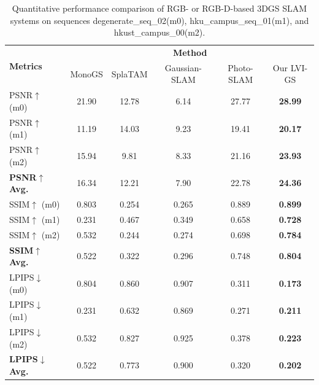 \documentclass[lettersize,journal]{IEEEtran}
\begin{document}
\clearpage %
\begin{table}[!p] %
    \centering
    \vfill %
    \renewcommand{\arraystretch}{1.0} %
    \setlength{\tabcolsep}{10pt} %
    \caption{Quantitative performance comparison of RGB- or RGB-D-based 3DGS SLAM systems on sequences degenerate_seq_02(m0), hku_campus_seq_01(m1), and hkust_campus_00(m2).}
    \label{tab:quantitativecomparison2}
    \begin{tabular}{@{}lccccc@{}}
        \toprule
        \multirow{2}{*}{\textbf{Metrics}} & \multicolumn{5}{c}{\textbf{Method}} \\
        \cmidrule(lr){2-6}
        & MonoGS\cite{monogs} & SplaTAM\cite{splatam} & Gaussian-SLAM\cite{gaussianslam} & Photo-SLAM\cite{photoslam} & Our LVI-GS \\
        \midrule
        PSNR$\uparrow$ (m0) & 21.90 & 12.78 & 6.14 & 27.77 & \textbf{28.99} \\
        PSNR$\uparrow$ (m1) & 11.19 & 14.03 & 9.23 & 19.41 & \textbf{20.17} \\
        PSNR$\uparrow$ (m2) & 15.94 & 9.81 & 8.33 & 21.16 & \textbf{23.93} \\
        \midrule
        \textbf{PSNR$\uparrow$ Avg.} & 16.34 & 12.21 & 7.90 & 22.78 & \textbf{24.36} \\
        \midrule
        SSIM$\uparrow$ (m0) & 0.803 & 0.254 & 0.265 & 0.889 & \textbf{0.899} \\
        SSIM$\uparrow$ (m1) & 0.231 & 0.467 & 0.349 & 0.658 & \textbf{0.728} \\
        SSIM$\uparrow$ (m2) & 0.532 & 0.244 & 0.274 & 0.698 & \textbf{0.784} \\
        \midrule
        \textbf{SSIM$\uparrow$ Avg.} & 0.522 & 0.322 & 0.296 & 0.748 & \textbf{0.804} \\
        \midrule
        LPIPS$\downarrow$ (m0) & 0.804 & 0.860 & 0.907 & 0.311 & \textbf{0.173} \\
        LPIPS$\downarrow$ (m1) & 0.231 & 0.632 & 0.869 & 0.271 & \textbf{0.211} \\
        LPIPS$\downarrow$ (m2) & 0.532 & 0.827 & 0.925 & 0.378 & \textbf{0.223} \\
        \midrule
        \textbf{LPIPS$\downarrow$ Avg.} & 0.522 & 0.773 & 0.900 & 0.320 & \textbf{0.202} \\
        \bottomrule
    \end{tabular}
    \captionsetup{justification=centering, labelsep=colon} %
    \vfill %
\end{table}
\clearpage %
\end{document}
